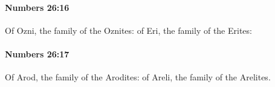 		\paragraph{Numbers 26:16} %
			\label{NUMBERS-26-16}

			Of Ozni, the family of the Oznites: of Eri, the family of the Erites:


		\paragraph{Numbers 26:17} %
			\label{NUMBERS-26-17}

			Of Arod, the family of the Arodites: of Areli, the family of the Arelites.


